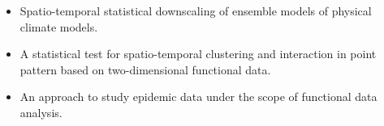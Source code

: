 \documentclass[11pt, a4paper]{awesome-cv}
\begin{document}
\begin{cvletter}
\begin{itemize}
    \item Spatio-temporal statistical downscaling of ensemble models of physical climate models.
    \item A statistical test for spatio-temporal clustering and interaction in point pattern based on two-dimensional functional data.
    \item An approach to study epidemic data under the scope of functional data analysis.
\end{itemize}
\end{cvletter}


\end{document}
